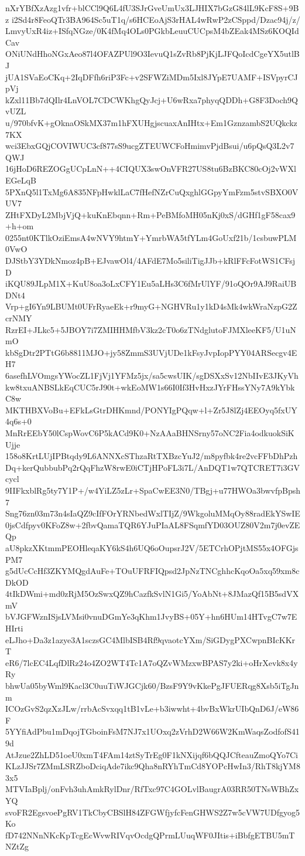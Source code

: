 nXrYBfXzAzg1vfr+blCCl9Q6L4fU3SJrGveUmUx3LJHIX7bGzG84lL9KcF8S+9Bz
i2Sd4r8FeoQTr3BA964Sc5uT1q/s6HCEoAjS3rHAL4wRwP2zCSppd/Dzac94j/z/
LmvyUxR4iz+ISfqNGze/0K4fMq4OLs0PGkbLeuuCUCpsM4bZEak4MSz6KOQIdCav
ONiUNdHhoNGxAeo87l4OFAZPUl9O3IevuQ1sZvRb8PjKjLJFQoIcdCgeYX5utlBJ
jUA1SVaEoCKq+2IqDFfh6riP3Fc+v2SFWZiMDm5Ixl8JYpE7UAMF+ISVpyrCJpVj
kZxl11Bb7dQIlr4LnVOL7CDCWKhgQyJcj+U6wRxa7phyqQDDh+G8F3Doch9QvUZL
u/970bfvK+gOknaOSkMX37m1hFXUHgjscuaxAnIHtx+Em1GznzambS2UQkckz7KX
wci3EbxGQjCOVIWUC3cf877sS9ucgZTEUWCFoHmimvPjdBsui/u6pQsQ3L2v7QWJ
16jHoD6REZOGgUCpLnN++4CIQUX3swOnVFR27US8tu6BzBKC80cOj2vWXlEGeLqB
5PXnQ5l1TxMg6A835NFpHwklLaC7fHefNZrCuQxghlGGpyYmFzm5stvSBXO0VUV7
ZHtFXDyL2MbjVjQ+kuKnEbqnn+Rm+PeBMfoMH05nKj0xS/dGHf1gF58cax9+h+om
0255nt0KTlkOziEmsA4wNVY9htmY+YmrbWA5tfYLm4GoUxf21b/1csbuwPLM0VwO
DJStbY3YDkNmoz4pB+EJvawOl4/4AFdE7Mo5siliTigJJb+kRlFFcFotWS1CFsjD
iKQU89JLpM1X+KuU8oa3oLxCFY1Eu5aLHs3C6fMrUlYF/91oQOr9AJ9RaiUBDNt4
Vrp+gI6Yn9LBUMt0UFrRyaeEk+r9myG+NGHVRu1y1kD4sMk4wkWraNzpG2ZcrNMY
RzrEI+JLkc5+5JBOY7i7ZMIHHMfbV3kz2cT0o6zTNdglutoFJMXleeKF5/U1uNmO
kbSgDtr2PTtG6b8811MJO+jy58ZmmS3UVjUDe1kFsyJvpIopPYY04ARSecgv4EH7
6asefhLVOmgsYWocZL1FjVj1YFMz5jx/sa5cwsUIK/sgDSXxSv12NbIIvE3JKyVh
kw8txuANBSLkEqCUC5rJ90t+wkEoMW1s66I0If3HvHxzJYrFHssYNy7A9kYbkC8w
MKTHBXVoBu+EFkLsGtrDHKmnd/PONYIgPQqw+l+Zr5J8lZj4EEOyq5fxUY4q6s+0
MnRrEEbY50lCspWovC6P5kACd9K0+NzAAaBHNSrny57oNC2Fia4odkuokSiKUjje
158o8KrtLUjIPBtqdy9L6ANNXcSThzaRtTXBzcYuJ2/m8pyfbk4re2vcFFbDhPzh
Dq+kerQubbubPq2rQqFhzW8rwE0iCTjHPoFL3i7L/AnDQT1w7QTCRET7i3GVcycl
9IIFkxblRg5ty7Y1P+/w4YiLZ5zLr+SpaCwEE3N0/TBgj+u77HWOa3bwvfpBpsh7
Sng76zn03m73n4sIaQZ9cIfFOrYRNbedWxlTIjZ/9WkgoluMMqOy88radEkYSwIE
0jsCdfpyv0KFoZ8w+2fbvQamaTQR6YJuPIaAL8FSqmfYD03OUZ80V2m7j0evZEQp
aU8pkzXKtmmPEOHleqaKY6kS4h6UQ6oOupsrJ2V/5ETCrhOPjtMS55x4OFGjsPM7
g5dUcCcHf3ZKYMQgdAuFe+TOuUFRFIQpsd2JpNzTNCghhcKqoOa5xq59xm8cDkOD
4tIkDWmi+md0zRjM5OzSwxQZ9hCazfkSvlN1Gi5/YoAbNt+8JMazQf15B5sdVXmV
bVJGFWznISjsLVMsi0vnuDGmYe3qKhm1JvyBS+05Y+hn6HUm14HTvgC7w7EHIrti
eLJho+Da3z1azye3A1sczsGC4MlbISB4Rf9qvaotcYXm/SiGDygPXCwpnBIcKKrT
eR6/7lcEC4LqfDlRz24o4ZO2WT4Tc1A7oQZvWMzxwBPAS7y2ki+oHrXevk8x4yRy
bhwUa05byWml9Kacl3C0uuTiWJGCjk60/BzsF9Y9vKkePgJFUERqg8Xsb5iTgJnm
ICOzGvS2qzXzJLw/rrbAcSvxqq1tB1vLe+b3iwwht+4bvBxWkrUIbQnD6J/eW86F
5YYfiAdPbu1mDqojTGboinFsM7NJ7x1UOxq2zVrhD2W66W2KmWaqsZodfofS419d
AtJzue2ZhLD51oeU0xmT4FAm14ztSyTrEg0F1kNXijqf6bQQJCfteauZmoQYo7Ci
KLzJJSr7ZMmLSRZboDciqAde7ikc9Qha8nRYhTmCd8YOPcHwIn3/RhT8kjYM83x5
MTVIaBplj/onFvh3uhAmkRylDnr/RfTxc97C4GOLvlBaugrA03RR50TNsWBhZxYQ
svoFR2EgsvoePgRV1TkCbyCBSlH84ZFGWfjyfcFenGHWS2Z7w5cVW7UDfgyog5Ko
fD742NNnNKcKpTcgEcWvwRIVqvOcdgQPrmLUuqWF0JItis+iBbfgETBU5mTNZtZg
